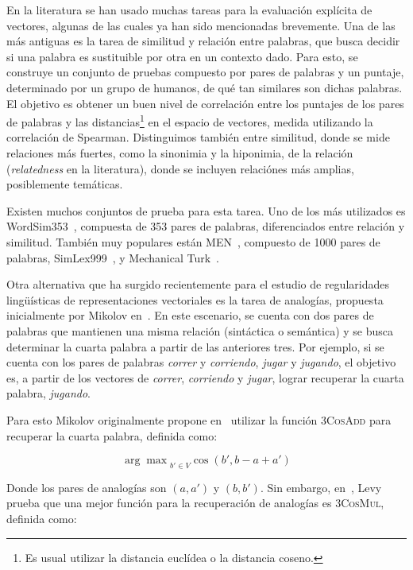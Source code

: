 En la literatura se han usado muchas tareas para la evaluación explícita de vectores, algunas de las
cuales ya han sido mencionadas brevemente. Una de las más antiguas es la tarea de similitud y
relación entre palabras, que busca decidir si una palabra es sustituible por otra en un contexto
dado. Para esto, se construye un conjunto de pruebas compuesto por pares de palabras y un puntaje,
determinado por un grupo de humanos, de qué tan similares son dichas palabras. El objetivo es
obtener un buen nivel de correlación entre los puntajes de los pares de palabras y las
distancias\footnote{Es usual utilizar la distancia euclídea o la distancia coseno.} en el espacio de
vectores, medida utilizando la correlación de Spearman. Distinguimos también entre similitud, donde
se mide relaciones más fuertes, como la sinonimia y la hiponimia, de la relación
(\textit{relatedness} en la literatura), donde se incluyen relaciónes más amplias, posiblemente
temáticas.

Existen muchos conjuntos de prueba para esta tarea. Uno de los más utilizados es
WordSim353~\cite{Finkelstein2002}, compuesta de 353 pares de palabras, diferenciados entre relación
y similitud. También muy populares están MEN~\cite{Bruni2012}, compuesto de 1000 pares de palabras,
SimLex999~\cite{Hill2014}, y Mechanical Turk~\cite{Radinsky2011}.

Otra alternativa que ha surgido recientemente para el estudio de regularidades lingüísticas de
representaciones vectoriales es la tarea de analogías, propuesta inicialmente por Mikolov
en~\cite{Mikolov2013a}. En este escenario, se cuenta con dos pares de palabras que mantienen una
misma relación (sintáctica o semántica) y se busca determinar la cuarta palabra a partir de las
anteriores tres. Por ejemplo, si se cuenta con los pares de palabras \textit{correr} y
\textit{corriendo}, \textit{jugar} y \textit{jugando}, el objetivo es, a partir de los vectores de
\textit{correr}, \textit{corriendo} y \textit{jugar}, lograr recuperar la cuarta palabra,
\textit{jugando}.

Para esto Mikolov originalmente propone en~\cite{Mikolov2013a} utilizar la función \textsc{3CosAdd}
para recuperar la cuarta palabra, definida como:

\[
  {\arg \max}_{b' \in V} \cos(b', b - a + a')
\]

Donde los pares de analogías son $(a, a')$ y $(b, b')$. Sin embargo, en~\cite{Levy2014b}, Levy
prueba que una mejor función para la recuperación de analogías es \textsc{3CosMul}, definida como:

